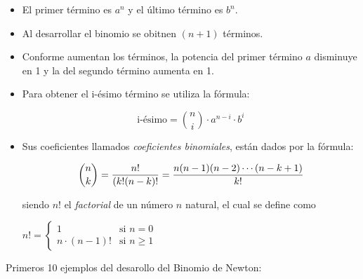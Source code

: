 \begin{itemize}{}
    \item El primer t\'ermino es $a^{n}$ y el \'ultimo t\'ermino es $b^{n}$.
    \item Al desarrollar el binomio se obitnen $(n+1)$ t\'erminos.
    \item Conforme aumentan los t\'erminos, la potencia del primer t\'ermino $a$ disminuye en 1 y la del segundo t\'ermino aumenta en 1.
    \item Para obtener el i-\'esimo t\'ermino se utiliza la f\'ormula:


    \begin{equation}
        \text{i-\'esimo} = \binom{n}{i} \cdot a^{n-i} \cdot b^i
    \end{equation}
    
    \item Sus coeficientes llamados \textit{coeficientes binomiales}, están dados por la f\'ormula:

    \begin{equation}
        \binom{n}{k} = \frac{n!}{(k!(n-k)!} = \frac{n(n-1)(n-2)\dotsb(n-k+1)}{k!} \\
    \end{equation}

    siendo $n!$ el \textit{factorial} de un n\'umero $n$ natural, el cual se define como

    \begin{center}
         $n! = \begin{cases}
                      1 & \text{si } n = 0 \\
                      n \cdot (n-1)! & \text{si } n \geq 1
                \end{cases}$
    \end{center}

  


\end{itemize}

    
    
\noindent Primeros 10 ejemplos del desarollo del Binomio de Newton: \\

